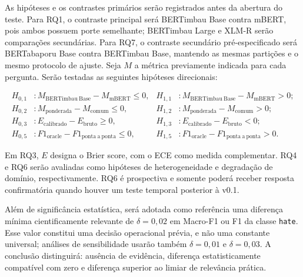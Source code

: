 As hipóteses e os contrastes primários serão registrados antes da abertura do
teste. Para RQ1, o contraste principal será BERTimbau Base contra mBERT, pois
ambos possuem porte semelhante; BERTimbau Large e XLM-R serão comparações
secundárias. Para RQ7, o contraste secundário pré-especificado será BERTabaporu
Base contra BERTimbau Base, mantendo as mesmas partições e o mesmo protocolo de ajuste. Seja
$M$ a métrica previamente indicada para cada pergunta. Serão
testadas as seguintes hipóteses direcionais:

\begin{align}
    H_{0,1}&: M_{\mathrm{BERTimbau\ Base}}-M_{\mathrm{mBERT}} \leq 0,
    &H_{1,1}&: M_{\mathrm{BERTimbau\ Base}}-M_{\mathrm{mBERT}} > 0;\\
    H_{0,2}&: M_{\mathrm{ponderada}}-M_{\mathrm{comum}} \leq 0,
    &H_{1,2}&: M_{\mathrm{ponderada}}-M_{\mathrm{comum}} > 0;\\
    H_{0,3}&: E_{\mathrm{calibrado}}-E_{\mathrm{bruto}} \geq 0,
    &H_{1,3}&: E_{\mathrm{calibrado}}-E_{\mathrm{bruto}} < 0;\\
    H_{0,5}&: F1_{\mathrm{oracle}}-F1_{\mathrm{ponta\ a\ ponta}} \leq 0,
    &H_{1,5}&: F1_{\mathrm{oracle}}-F1_{\mathrm{ponta\ a\ ponta}} > 0.
\end{align}

Em RQ3, $E$ designa o Brier score, com o ECE como medida complementar. RQ4 e
RQ6 serão avaliadas como hipóteses de heterogeneidade e degradação de domínio,
respectivamente. RQ6 é prospectiva e somente poderá receber resposta
confirmatória quando houver um teste temporal posterior à v0.1.

Além de significância estatística, será adotada como referência uma diferença
mínima cientificamente relevante de $\delta=0{,}02$ em Macro-F1 ou F1 da classe
\texttt{hate}. Esse valor constitui uma decisão operacional prévia, e não uma
constante universal; análises de sensibilidade usarão também $\delta=0{,}01$ e
$\delta=0{,}03$. A conclusão distinguirá: ausência de evidência, diferença
estatisticamente compatível com zero e diferença superior ao limiar de relevância
prática.

